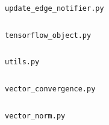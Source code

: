 \documentclass{subfiles}
\begin{document}
      \begin{figure}
        \centering
        \inputminted[linenos]{python}{../src/utils/update_edge_notifier.py}
        \caption{\texttt{update\_edge\_notifier.py}}
        \label{code:update_edge_notifier}
      \end{figure}

      \begin{figure}
        \centering
        \inputminted[linenos]{python}{../src/utils/tensorflow_object.py}
        \caption{\texttt{tensorflow\_object.py}}
        \label{code:tensorflow_object}
      \end{figure}

      \begin{figure}
        \centering
        \inputminted[linenos]{python}{../src/utils/utils.py}
        \caption{\texttt{utils.py}}
        \label{code:utils}
      \end{figure}

      \begin{figure}
        \centering
        \inputminted[linenos]{python}{../src/utils/vector_convergence.py}
        \caption{\texttt{vector\_convergence.py}}
        \label{code:utils}
      \end{figure}

      \begin{figure}
        \centering
        \inputminted[linenos]{python}{../src/utils/vector_norm.py}
        \caption{\texttt{vector\_norm.py}}
        \label{code:vector_norm}
      \end{figure}
\end{document}
